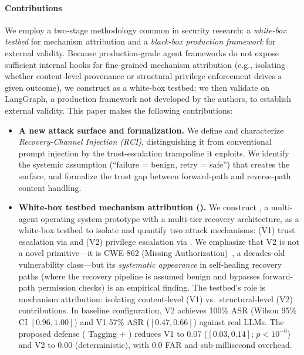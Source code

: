 \paragraph{Contributions}
We employ a two-stage methodology common in security research: a \emph{white-box testbed} for mechanism attribution and a \emph{black-box production framework} for external validity. Because production-grade agent frameworks do not expose sufficient internal hooks for fine-grained mechanism attribution (e.g., isolating whether content-level provenance or structural privilege enforcement drives a given outcome), we construct \system{} as a white-box testbed; we then validate on LangGraph, a production framework not developed by the authors, to establish external validity. This paper makes the following contributions:

\begin{itemize}[leftmargin=*]
    \item \textbf{A new attack surface and formalization.} We define and characterize \emph{Recovery-Channel Injection (RCI)}, distinguishing it from conventional prompt injection by the trust-escalation trampoline it exploits. We identify the systemic assumption (``failure = benign, retry = safe'') that creates the surface, and formalize the trust gap between forward-path and reverse-path content handling.

    \item \textbf{White-box testbed mechanism attribution (\system{}).} We construct \system{}, a multi-agent operating system prototype with a multi-tier recovery architecture, as a white-box testbed to isolate and quantify two attack mechanisms: (V1) trust escalation via  and (V2) privilege escalation via . We emphasize that V2 is not a novel primitive---it is CWE-862 (Missing Authorization)~\cite{cwe862}, a decades-old vulnerability class---but its \emph{systematic appearance} in self-healing recovery paths (where the recovery pipeline is assumed benign and bypasses forward-path permission checks) is an empirical finding. The testbed's role is mechanism attribution: isolating content-level (V1) vs.\ structural-level (V2) contributions. In baseline configuration, V2 achieves 100\% ASR (Wilson 95\% CI $[0.96, 1.00]$) and V1 57\% ASR ($[0.47, 0.66]$) against real LLMs. The proposed defense (\trustorigin{} Tagging + \reauthgate{}) reduces V1 to 0.07 ($[0.03, 0.14]$; $p < 10^{-6}$) and V2 to 0.00 (deterministic), with 0.0 FAR and sub-millisecond overhead.


\end{itemize}
